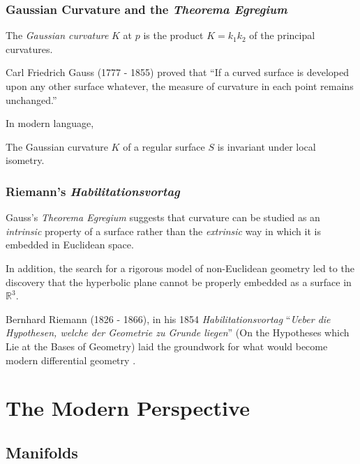 \documentclass[handout]{beamer}
\newcommand{\R}{\mathbb{R}}
\theoremstyle{definition}
\begin{document}
\begin{frame}
    \frametitle{Gaussian Curvature and the \emph{Theorema Egregium}}

    \pause
    \begin{definition}
        The \emph{Gaussian curvature} $K$ at $p$ is the product $K = k_1k_2$
        of the principal curvatures.
    \end{definition}

    \pause
    Carl Friedrich Gauss (1777 - 1855) proved that ``If a curved surface is developed
    upon any other surface whatever, the measure of curvature in each point remains unchanged.''

    \pause
    In modern language,
    \begin{theorem}
        The Gaussian curvature $K$ of a regular surface $S$ is invariant under
        local isometry.
    \end{theorem}

\end{frame}

\begin{frame}
    \frametitle{Riemann's \textit{Habilitationsvortag}}

    \pause
    Gauss's \emph{Theorema Egregium} suggests that curvature can
    be studied as an \emph{intrinsic} property of a surface rather than
    the \emph{extrinsic} way in which it is embedded in Euclidean space.

    \pause
    In addition, the search for a rigorous model of non-Euclidean geometry
    led to the discovery that the hyperbolic plane cannot be properly embedded
    as a surface in $\R^3$.

    \pause
    Bernhard Riemann (1826 - 1866), in his 1854 \emph{Habilitationsvortag}
    ``\emph{Ueber die Hypothesen, welche der Geometrie zu Grunde liegen}''
    (On the Hypotheses which Lie at the Bases of Geometry) laid the groundwork
    for what would become modern differential geometry \cite{geom-diff-view,riemann}.

\end{frame}

\section{The Modern Perspective}

\subsection{Manifolds}
\end{document}
